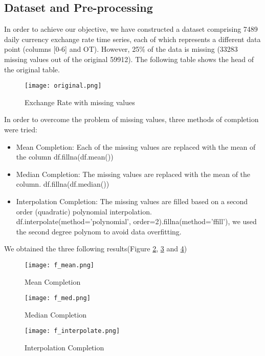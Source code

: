 \documentclass[10pt]{article}
\begin{document}
\begin{multicols}{2}
\subsection{Dataset and Pre-processing}

In order to achieve our objective, we have constructed a dataset comprising 7489 daily currency exchange rate time series, each of which represents a different data point (columns [0-6] and OT). However, 25\% of the data is missing (33283 missing values out of the original 59912). \newline
The following table shows the head of the original table.

\begin{figure}[H]
\centering
\texttt{[image: original.png]}
\caption{Exchange Rate with missing values}
\label{f6}
\end{figure}

In order to overcome the problem of missing values, three methods of completion were tried:

\begin{itemize}
    \item Mean Completion: Each of the missing values are replaced with the mean of the column df.fillna(df.mean())
    \item Median Completion: The missing values are replaced with the mean of the column. df.fillna(df.median())
    \item Interpolation Completion: The missing values are filled based on a second order (quadratic) polynomial interpolation.
    df.interpolate(method='polynomial', order=2).fillna(method='ffill'), we used the second degree polynom to avoid data overfitting.

\end{itemize}

We obtained the three following results(Figure \ref{f7}, \ref{f8} and \ref{f9})

\begin{figure}[H]
\centering
\texttt{[image: f\_mean.png]}
\caption{Mean Completion}
\label{f7}
\end{figure}

\begin{figure}[H]
\centering
\texttt{[image: f\_med.png]}
\caption{Median Completion}
\label{f8}
\end{figure}

\begin{figure}[H]
\centering
\texttt{[image: f\_interpolate.png]}
\caption{Interpolation Completion}
\label{f9}
\end{figure}




\end{multicols}
\end{document}
